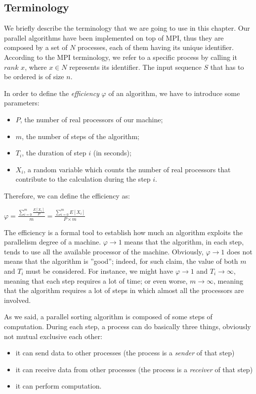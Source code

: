 \label{terminology}
\subsection*{Terminology}
We briefly describe the terminology that we are going to use in this chapter. Our parallel algorithms have been implemented on top of MPI, thus they are composed by a set of $N$ processes, each of them having its unique identifier. According to the MPI terminology, we refer to a specific process by calling it $rank$ $x$, where $x \in N$ represents its identifier. The input sequence $S$ that has to be ordered is of size $n$. 

In order to define the \textit{efficiency} $\varphi$ of an algorithm, we have to introduce some parameters:
\begin{itemize}
\item $P$, the number of real processors of our machine; 
\item $m$, the number of steps of the algorithm;
\item $T_i$, the duration of step $i$ (in seconds);
\item $X_i$, a random variable which counts the number of real processors that contribute to the calculation during the step $i$.
\end{itemize}
Therefore, we can define the efficiency as:
\begin{center}
$\varphi = \frac{\sum_{i=0}^m \frac{E[X_i]}{P}}{m} = \frac{\sum_{i=0}^m E[X_i]}{P \times m} $
\end{center}
The efficiency is a formal tool to establish how much an algorithm exploits the parallelism degree of a machine. $\varphi \rightarrow 1$ means that the algorithm, in each step, tends to use all the available processor of the machine. Obviously, $\varphi \rightarrow 1$ does not means that the algorithm is ''good''; indeed, for such claim, the value of both $m$ and $T_i$ must be considered. For instance, we might have $\varphi \rightarrow 1$ and $T_i \rightarrow\infty$, meaning that each step requires a lot of time; or even worse, $m \rightarrow\infty$, meaning that the algorithm requires a lot of steps in which almost all the processors are involved.

As we said, a parallel sorting algorithm is composed of some steps of computation. During each step, a process can do basically three things, obviously not mutual exclusive each other:
\begin{itemize}
\item it can send data to other processes (the process is a \textit{sender} of that step)
\item it can receive data from other processes (the process is a \textit{receiver} of that step)
\item it can perform computation.
\end{itemize}
